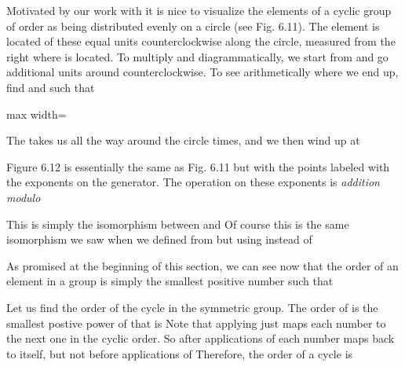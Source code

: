 \documentclass[11pt,oneside]{article}
\begin{document}
\begin{BookBody}
 Motivated by our work with  it is nice to visualize the elements   of a cyclic group of order  as being distributed evenly on a circle (see Fig. 6.11). The element  is located  of these equal units counterclockwise along the circle, measured from the right where  is located. To multiply  and  diagrammatically, we start from  and go  additional units around counterclockwise. To see arithmetically where we end up, find  and  such that

\begin{center}\begin{adjustbox}{max width=\linewidth}\end{adjustbox}\end{center}

\noindent The  takes us all the way around the circle  times, and we then wind up at \BookEnd{\blacktriangle}

Figure 6.12 is essentially the same as Fig. 6.11 but with the points labeled with the exponents on the generator. The operation on these exponents is\textit{ addition modulo} 

This is simply the isomorphism between  and  Of course this is the same isomorphism we saw when we defined  from  but using  instead of 

As promised at the beginning of this section, we can see now that the order of an element  in a group  is simply the smallest positive number  such that 

 Let us find the order of the cycle in the symmetric group. The order of \BookInline{\sigma } is the smallest postive power of \BookInline{\sigma } that is  Note that applying \BookInline{\sigma } just maps each number to the next one in the cyclic order. So after  applications of \BookInline{\sigma,\allowbreak } each number maps back to itself, but not before  applications of  Therefore, the order of a cycle is \BookEnd{\blacktriangle}

\end{BookBody}
\end{document}
